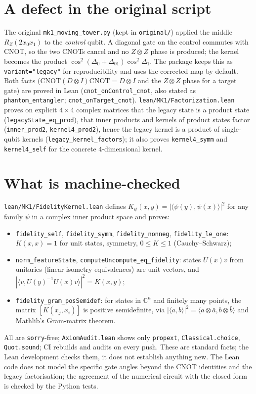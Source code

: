 \documentclass[11pt]{article}
\begin{document}
\section{A defect in the original script}
The original \texttt{mk1\_moving\_tower.py} (kept in \texttt{original/}) applied the middle $R_Z(2x_0x_1)$ to the \emph{control} qubit.
A diagonal gate on the control commutes with CNOT, so the two CNOTs cancel and no $Z\otimes Z$ phase is produced; the kernel becomes the
product $\cos^2(\Delta_0+\Delta_{01})\cos^2\Delta_1$. The package keeps this as \texttt{variant="legacy"} for reproducibility and uses
the corrected map by default. Both facts ($\mathrm{CNOT}(D\otimes I)\mathrm{CNOT}=D\otimes I$ and the $Z\otimes Z$ phase for a target gate)
are proved in Lean (\texttt{cnot\_onControl\_cnot}, also stated as \texttt{phantom\_entangler}; \texttt{cnot\_onTarget\_cnot}). \texttt{lean/MK1/Factorization.lean} proves on explicit $4\times4$ complex
matrices that the legacy state is a product state (\texttt{legacyState\_eq\_prod}), that inner products and kernels of product states factor
(\texttt{inner\_prod2}, \texttt{kernel4\_prod2}), hence the legacy kernel is a product of single-qubit kernels (\texttt{legacy\_kernel\_factors});
it also proves \texttt{kernel4\_symm} and \texttt{kernel4\_self} for the concrete $4$-dimensional kernel.

\section{What is machine-checked}
\texttt{lean/MK1/FidelityKernel.lean} defines $K_\psi(x,y)=|\langle\psi(y),\psi(x)\rangle|^2$ for any family $\psi$ in a complex inner product space and proves:
\begin{itemize}
\item \texttt{fidelity\_self}, \texttt{fidelity\_symm}, \texttt{fidelity\_nonneg}, \texttt{fidelity\_le\_one}: $K(x,x)=1$ for unit states, symmetry, $0\le K\le1$ (Cauchy--Schwarz);
\item \texttt{norm\_featureState}, \texttt{computeUncompute\_eq\_fidelity}: states $U(x)v$ from unitaries (linear isometry equivalences) are unit vectors, and $|\langle v,U(y)^{-1}U(x)v\rangle|^2=K(x,y)$;
\item \texttt{fidelity\_gram\_posSemidef}: for states in $\mathbb{C}^n$ and finitely many points, the matrix $[K(x_j,x_i)]$ is positive semidefinite,
via $|\langle a,b\rangle|^2=\langle a\otimes\bar a,b\otimes\bar b\rangle$ and Mathlib's Gram-matrix theorem.
\end{itemize}
All are \texttt{sorry}-free; \texttt{AxiomAudit.lean} shows only \texttt{propext}, \texttt{Classical.choice}, \texttt{Quot.sound}; CI rebuilds and audits on every push.
These are standard facts; the Lean development checks them, it does not establish anything new.
The Lean code does not model the specific gate angles beyond the CNOT identities and the legacy factorisation; the agreement of the numerical circuit with the closed form is checked by the Python tests.
\end{document}
